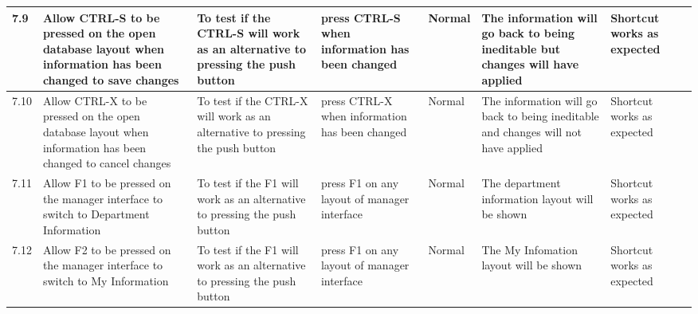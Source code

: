 \begin{landscape}
\begin{center}
\begin{longtable}{|p{1.5cm}|p{2cm}|p{2.5cm}|p{2cm}|p{2cm}|p{2cm}|p{3cm}|p{1.7cm}|}
\rowcolor{lightgray}7.9 & Allow CTRL-S to be pressed on the open database layout when information has been changed to save changes& To test if the CTRL-S will work as an alternative to pressing the push button & press CTRL-S when information has been changed & Normal & The information will go back to being ineditable but changes will have applied  &Shortcut works as expected& \\ \hline
\rowcolor{lightgray}7.10 & Allow CTRL-X to be pressed on the open database layout when information has been changed to cancel changes & To test if the CTRL-X will work as an alternative to pressing the push button & press CTRL-X when information has been changed & Normal & The information will go back to being ineditable and changes will not have applied  &Shortcut works as expected& \\ \hline
\rowcolor{lightgray}7.11& Allow F1 to be pressed on the manager interface to switch to Department Information  & To test if the F1 will work as an alternative to pressing the push button & press F1 on any layout of manager interface & Normal & The department information layout will be shown  &Shortcut works as expected& \\ \hline
\rowcolor{lightgray}7.12 & Allow F2 to be pressed on the manager interface to switch to My Information  & To test if the F1 will work as an alternative to pressing the push button & press F1 on any layout of manager interface & Normal & The My Infomation layout will be shown  &Shortcut works as expected& \\ \hline




\end{longtable}
\end{center}
\end{landscape}
